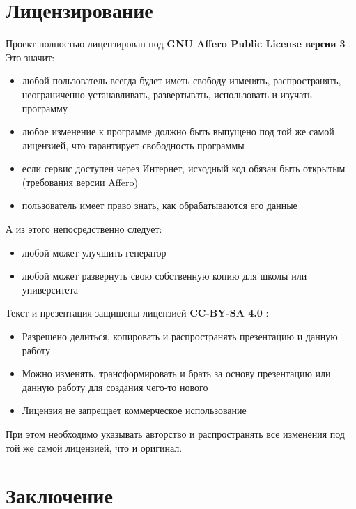 \documentclass[12pt,a4paper]{extarticle} %
\begin{document}
	\newpage
	
	\section{Лицензирование}
	Проект полностью лицензирован под \textbf{GNU Affero Public License версии 3} \cite{license_agplv3}. Это значит:
	
	\begin{itemize}
		\item любой пользователь всегда будет иметь свободу изменять, распространять, неограниченно устанавливать, развертывать, использовать и изучать программу
		\item любое изменение к программе должно быть выпущено под той же самой лицензией, что гарантирует свободность программы
		\item если сервис доступен через Интернет, исходный код обязан быть открытым (требования версии Affero)
		\item пользователь имеет право знать, как обрабатываются его данные
	\end{itemize}
	
	А из этого непосредственно следует:
	
	\begin{itemize}
		\item любой может улучшить генератор
		\item любой может развернуть свою собственную копию для школы или университета
	\end{itemize}
	
	Текст и презентация защищены лицензией \textbf{CC-BY-SA 4.0} \cite{license_cc_by_sa}:
	
	\begin{itemize}
		\item Разрешено делиться, копировать и распространять презентацию и данную работу
		\item Можно изменять, трансформировать и брать за основу презентацию или данную работу для создания чего-то нового
		\item Лицензия не запрещает коммерческое использование
	\end{itemize}
	
	При этом необходимо указывать авторство и распространять все изменения под той же самой лицензией, что и оригинал.
	
	
	\newpage
	
	\section*{Заключение}
	
\end{document}
